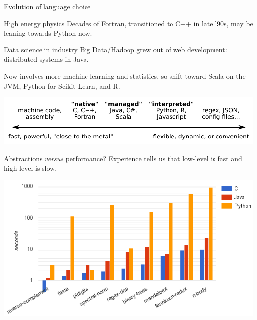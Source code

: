 \documentclass{beamer}
\begin{document}
\begin{frame}{Evolution of language choice}
\vspace{0.5 cm}
\begin{block}{High energy physics}
Decades of Fortran, transitioned to C++ in late '90s, may be leaning towards Python now.
\end{block}

\begin{block}{Data science in industry}
Big Data/Hadoop grew out of web development: distributed systems in Java.

\vspace{0.25 cm}
Now involves more machine learning and statistics, so shift toward Scala on the JVM, Python for Scikit-Learn, and R.
\end{block}

\vspace{0.5 cm}
\includegraphics[width=\linewidth]{languages1.pdf}
\end{frame}

\begin{frame}{Abstractions {\it versus} performance?}
\vspace{0.5 cm}
Experience tells us that low-level is fast and high-level is slow.

\vspace{0.5 cm}
\includegraphics[width=\linewidth]{benchmark-games.png}
\end{frame}
\end{document}
